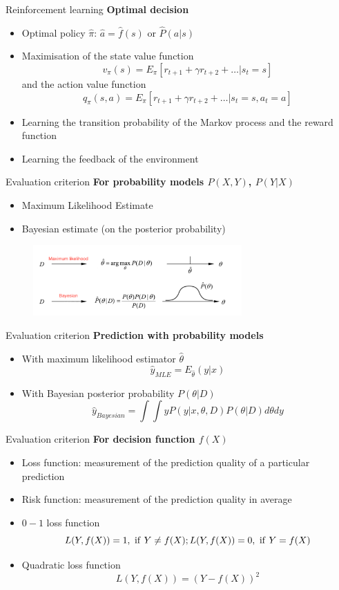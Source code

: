 \documentclass{beamer}
\begin{document}
\begin{frame}{Reinforcement learning}
\textbf{Optimal decision}
\begin{itemize}
\item Optimal policy $\widehat{\pi}$: $\widehat{a}=\widehat{f}(s)$ or $\widehat{P}(a | s)$
\item Maximisation of the state value function
$$
v_\pi(s) = E_{\pi}[r_{t+1}+\gamma r_{t+2}+\ldots|s_t = s]
$$
and the action value function
$$
q_\pi(s, a) = E_{\pi}[r_{t+1}+\gamma r_{t+2}+\ldots|s_t = s, a_t = a]
$$
\item Learning the transition probability of the Markov process and the reward function
\item Learning the feedback of the environment  
\end{itemize}
\end{frame}

\begin{frame}{Evaluation criterion}
\textbf{For probability models $P(X, Y)$, $P(Y|X)$}
\begin{itemize}
\item Maximum Likelihood Estimate
\item Bayesian estimate (on the posterior probability)
\end{itemize}
\begin{figure}
\centering
\includegraphics[width=8cm]{ep17.png}
\end{figure}
\end{frame}

\begin{frame}{Evaluation criterion}
\textbf{Prediction with probability models}
\begin{itemize}
\item With maximum likelihood estimator $\widehat{\theta}$
$$
\widehat{y}_{MLE} = E_{\widehat{\theta}}(y|x)
$$
\item With Bayesian posterior probability ${P}(\theta | D)$
$$
\widehat{y}_{Bayesian} = \int \int y P(y|x, \theta, D) P(\theta | D) d\theta dy
$$
\end{itemize}
\end{frame}

\begin{frame}{Evaluation criterion}
\textbf{For decision function $f(X)$}
\begin{itemize}
\item Loss function: measurement of the prediction quality of a particular prediction
\item Risk function: measurement of the prediction quality in average
\item $0-1$ loss function
$$
L(Y, f(X)) = 1,\ {\rm if}\ Y\neq f(X); L(Y, f(X)) = 0,\ {\rm if}\ Y= f(X)
$$
\item Quadratic loss function
$$
L(Y, f(X)) = (Y-f(X))^2
$$
\end{itemize}
\end{frame}
\end{document}
